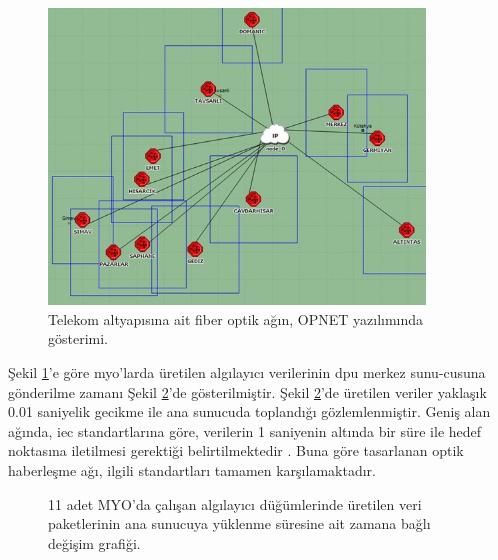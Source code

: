 \begin{figure}[htbp]
\centerline{\includegraphics[width=10cm]{Resim/sekil4-39.jpg}}
\caption{Telekom altyapısına ait fiber optik ağın, OPNET yazılımında gösterimi.}
\label{fig:4-39}
\end{figure}


Şekil \ref{fig:4-39}’e göre \gls{myo}'larda üretilen algılayıcı verilerinin \gls{dpu} merkez sunu-cusuna gönderilme zamanı Şekil \ref{fig:4-40}’de gösterilmiştir. Şekil \ref{fig:4-40}’de üretilen veriler yaklaşık 0.01 saniyelik gecikme ile ana sunucuda toplandığı gözlemlenmiştir. Geniş alan ağında, \gls{iec} standartlarına göre, verilerin 1 saniyenin altında bir süre ile hedef noktasına iletilmesi gerektiği belirtilmektedir \cite{mackiewicz2006overview}. Buna göre tasarlanan optik haberleşme ağı, ilgili standartları tamamen karşılamaktadır.

\begin{figure}[htbp]
\centering




\caption{11 adet MYO'da çalışan algılayıcı düğümlerinde üretilen veri paketlerinin ana sunucuya yüklenme süresine ait zamana bağlı değişim grafiği.}
\label{fig:4-40}
\end{figure}


